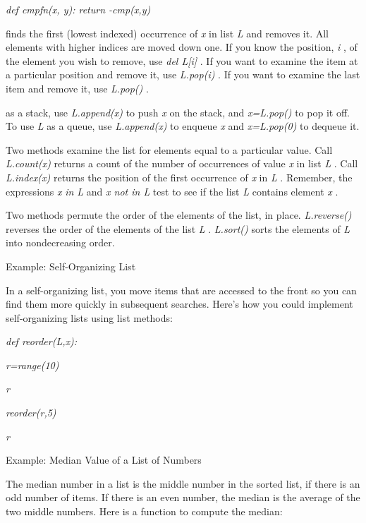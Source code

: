  \emph{def cmpfn(x, y): return
-cmp(x,y)}


finds the first (lowest indexed) occurrence of \emph{x} in list \emph{L}
and removes it. All elements with higher indices are moved down one. If
you know the position, \emph{i} , of the element you wish to remove, use
\emph{del L{[}i{]}} . If you want to examine the item at a particular
position and remove it, use \emph{L.pop(i)} . If you want to examine the
last item and remove it, use \emph{L.pop()} .

 as a stack, use
\emph{L.append(x)} to push \emph{x} on the stack, and \emph{x=L.pop()}
to pop it off. To use \emph{L} as a queue, use \emph{L.append(x)} to
enqueue \emph{x} and \emph{x=L.pop(0)} to dequeue it.

Two methods examine the list for
elements equal to a particular value. Call \emph{L.count(x)} returns a
count of the number of occurrences of value \emph{x} in list \emph{L} .
Call \emph{L.index(x)} returns the position of the first occurrence of
\emph{x} in \emph{L} . Remember, the expressions \emph{x} \emph{in L}
and \emph{x not in L} test to see if the list \emph{L} contains element
\emph{x} .

Two methods permute the order of
the elements of the list, in place. \emph{L.reverse()} reverses the
order of the elements of the list \emph{L} . \emph{L.sort()} sorts the
elements of \emph{L} into nondecreasing order.

Example: Self-Organizing List

In a self-organizing list, you move
items that are accessed to the front so you can find them more quickly
in subsequent searches. Here's how you could implement self-organizing
lists using list methods:


\emph{def reorder(L,x):}








\emph{r=range(10)}


\emph{r}




\emph{reorder(r,5)}


\emph{r}



Example: Median Value of a List of
Numbers

The median number in a list is the
middle number in the sorted list, if there is an odd number of items. If
there is an even number, the median is the average of the two middle
numbers. Here is a function to compute the median:


